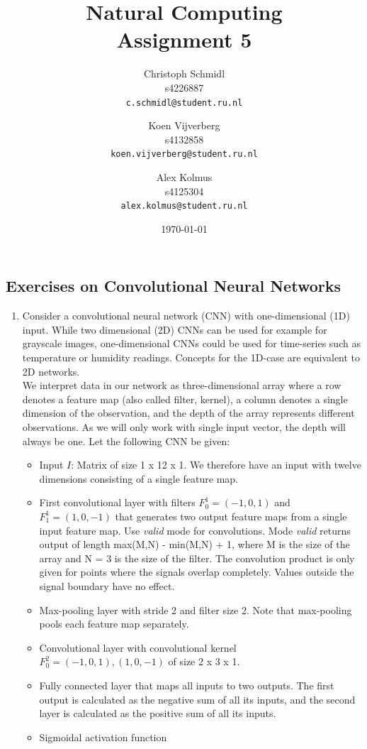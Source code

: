 \documentclass[a4paper]{article}
\title{Natural Computing\\Assignment 5}
\author{
  Christoph Schmidl\\ s4226887\\      \texttt{c.schmidl@student.ru.nl}
  \and
  Koen Vijverberg\\ s4132858\\     \texttt{koen.vijverberg@student.ru.nl}
  \and
  Alex Kolmus\\	s4125304\\	\texttt{alex.kolmus@student.ru.nl}
}
\date{\today}
\begin{document}
\maketitle


\subsection*{Exercises on Convolutional Neural Networks}

\begin{enumerate}

	\item Consider a convolutional neural network (CNN) with one-dimensional (1D) input. While two dimensional (2D) CNNs can be used for example for grayscale images, one-dimensional CNNs could be used for time-series such as temperature or humidity readings. Concepts for the 1D-case are equivalent to 2D networks.\\
	We interpret data in our network as three-dimensional array where a row denotes a feature map (also called filter, kernel), a column denotes a single dimension of the observation, and the depth of the array represents different observations. As we will only work with single input vector, the depth will always be one. Let the following CNN be given:
	
	\begin{itemize}
		\item Input $I$: Matrix of size 1 x 12 x 1. We therefore have an input with twelve dimensions consisting of a single feature map.
		\item First convolutional layer with filters $F_0^1 = (-1, 0, 1)$ and $F_1^1 = (1,0,-1)$ that generates two output feature maps from a single input feature map. Use \textit{valid} mode for convolutions. Mode \textit{valid} returns output of length max(M,N) - min(M,N) + 1, where M is the size of the array and N = 3 is the size of the filter. The convolution product is only given for points where the signals overlap completely. Values outside the signal boundary have no effect.
		\item Max-pooling layer with stride 2 and filter size 2. Note that max-pooling pools each feature map separately.
		\item Convolutional layer with convolutional kernel $F_0^2 = (-1,0,1), (1,0,-1)$ of size 2 x 3 x 1.
		\item Fully connected layer that maps all inputs to two outputs. The first output is calculated as the negative sum of all its inputs, and the second layer is calculated as the positive sum of all its inputs.
		\item Sigmoidal activation function
	\end{itemize}
	

\end{enumerate}
\end{document}
